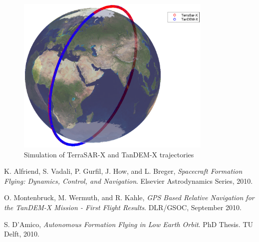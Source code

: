 \documentclass[11pt,letterpaper]{article}
\begin{document}
\begin{figure}[H]
	\centering
    \includegraphics[height=3in]{Figures/Traj2.eps}
    \caption{Simulation of TerraSAR-X and TanDEM-X trajectories}
    \label{figure:traj}
\end{figure}



% 

\newpage
\begin{thebibliography}{9}
K. Alfriend, S. Vadali, P. Gurfil, J. How, and L. Breger, \textit{Spacecraft Formation Flying: Dynamics, Control, and Navigation}. Elsevier Astrodynamics Series, 2010. 

O. Montenbruck, M. Wermuth, and R. Kahle,
\textit{GPS Based Relative Navigation for the TanDEM-X Mission - First Flight Results}. DLR/GSOC, September 2010.

S. D'Amico, \textit{Autonomous Formation Flying
in Low Earth Orbit}. PhD Thesis. TU Delft, 2010.

% 

\end{thebibliography}
\end{document}
